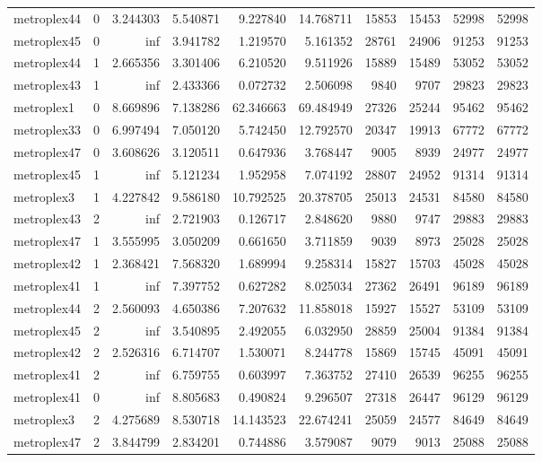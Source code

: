 \begin{longtable}{|l|r|r|r|r|r|r|r|r|r|}
metroplex44 & 0 & 3.244303 & 5.540871 & 9.227840 & 14.768711 & 15853 & 15453 & 52998 & 52998 \\
metroplex45 & 0 & inf & 3.941782 & 1.219570 & 5.161352 & 28761 & 24906 & 91253 & 91253 \\
metroplex44 & 1 & 2.665356 & 3.301406 & 6.210520 & 9.511926 & 15889 & 15489 & 53052 & 53052 \\
metroplex43 & 1 & inf & 2.433366 & 0.072732 & 2.506098 & 9840 & 9707 & 29823 & 29823 \\
metroplex1 & 0 & 8.669896 & 7.138286 & 62.346663 & 69.484949 & 27326 & 25244 & 95462 & 95462 \\
metroplex33 & 0 & 6.997494 & 7.050120 & 5.742450 & 12.792570 & 20347 & 19913 & 67772 & 67772 \\
metroplex47 & 0 & 3.608626 & 3.120511 & 0.647936 & 3.768447 & 9005 & 8939 & 24977 & 24977 \\
metroplex45 & 1 & inf & 5.121234 & 1.952958 & 7.074192 & 28807 & 24952 & 91314 & 91314 \\
metroplex3 & 1 & 4.227842 & 9.586180 & 10.792525 & 20.378705 & 25013 & 24531 & 84580 & 84580 \\
metroplex43 & 2 & inf & 2.721903 & 0.126717 & 2.848620 & 9880 & 9747 & 29883 & 29883 \\
metroplex47 & 1 & 3.555995 & 3.050209 & 0.661650 & 3.711859 & 9039 & 8973 & 25028 & 25028 \\
metroplex42 & 1 & 2.368421 & 7.568320 & 1.689994 & 9.258314 & 15827 & 15703 & 45028 & 45028 \\
metroplex41 & 1 & inf & 7.397752 & 0.627282 & 8.025034 & 27362 & 26491 & 96189 & 96189 \\
metroplex44 & 2 & 2.560093 & 4.650386 & 7.207632 & 11.858018 & 15927 & 15527 & 53109 & 53109 \\
metroplex45 & 2 & inf & 3.540895 & 2.492055 & 6.032950 & 28859 & 25004 & 91384 & 91384 \\
metroplex42 & 2 & 2.526316 & 6.714707 & 1.530071 & 8.244778 & 15869 & 15745 & 45091 & 45091 \\
metroplex41 & 2 & inf & 6.759755 & 0.603997 & 7.363752 & 27410 & 26539 & 96255 & 96255 \\
metroplex41 & 0 & inf & 8.805683 & 0.490824 & 9.296507 & 27318 & 26447 & 96129 & 96129 \\
metroplex3 & 2 & 4.275689 & 8.530718 & 14.143523 & 22.674241 & 25059 & 24577 & 84649 & 84649 \\
metroplex47 & 2 & 3.844799 & 2.834201 & 0.744886 & 3.579087 & 9079 & 9013 & 25088 & 25088 \\

\end{longtable}

